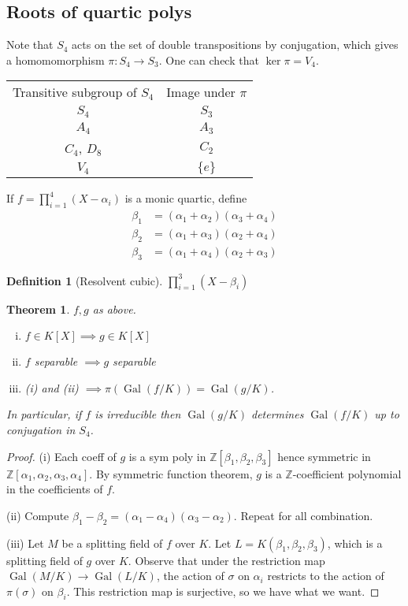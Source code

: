 \documentclass{article}
\theoremstyle{definition}
\newtheorem*{defn*}{Definition}
\theoremstyle{remark}
\theoremstyle{plain}
\newtheorem{thm}[defn]{Theorem}
\newcommand{\ZZ}{\mathbb{Z}}
\newcommand{\Gal}{\operatorname{Gal}}
\begin{document}
\subsection{Roots of quartic polys}
Note that $S_4$ acts on the set of double transpositions by conjugation, which gives a homomomorphism $\pi:S_4\to S_3$.
One can check that $\ker \pi=V_4$.
\begin{table}[H]
    \centering
    \begin{tabular}{|c|c|}
    \hline
       Transitive subgroup of $S_4$  & Image under $\pi$  \\
        $S_4$ & $S_3$\\ \hline
        $A_4$ & $A_3$\\ \hline
        $C_4$, $D_8$ & $C_2$\\ \hline
        $V_4$ & $\{e\}$\\ \hline
    \end{tabular}
\end{table}
If $f=\prod_{i=1}^4(X-\alpha_i)$ is a monic quartic, define 
\begin{align*}
    \beta_1&=(\alpha_1+\alpha_2)(\alpha_3+\alpha_4)\\
    \beta_2&=(\alpha_1+\alpha_3)(\alpha_2+\alpha_4)\\
    \beta_3&=(\alpha_1+\alpha_4)(\alpha_2+\alpha_3)
\end{align*}
\begin{defn*}[Resolvent cubic]
    $\prod_{i=1}^3(X-\beta_i)$
\end{defn*}
\begin{thm}
    $f,g$ as above. \begin{enumerate}[(i)]
        \item $f\in K[X]\implies g\in K[X]$
        \item $f$ separable $\implies g$ separable
        \item (i) and (ii) $\implies \pi(\Gal(f/K))=\Gal(g/K)$.
    \end{enumerate}
    In particular, if $f$ is irreducible then $\Gal(g/K)$ determines $\Gal(f/K)$ up to conjugation in $S_4$.
\end{thm}
\begin{proof}
    (i) Each coeff of $g$ is a sym poly in $\ZZ[\beta_1,\beta_2,\beta_3]$ hence symmetric in $\ZZ[\alpha_1,\alpha_2,\alpha_3,\alpha_4]$. By symmetric function theorem, $g$ is a $\ZZ$-coefficient polynomial in the coefficients of $f$.

    (ii) Compute $\beta_1-\beta_2=(\alpha_1-\alpha_4)(\alpha_3-\alpha_2)$. Repeat for all combination.

    (iii) Let $M$ be a splitting field of $f$ over $K$. Let $L=K(\beta_1,\beta_2,\beta_3)$, which is a splitting field of $g$ over $K$. Observe that under the restriction map $\Gal(M/K)\to \Gal(L/K)$, the action of $\sigma$ on $\alpha_i$ restricts to the action of $\pi(\sigma)$ on $\beta_i$. This restriction map is surjective, so we have what we want.
\end{proof}
\end{document}
